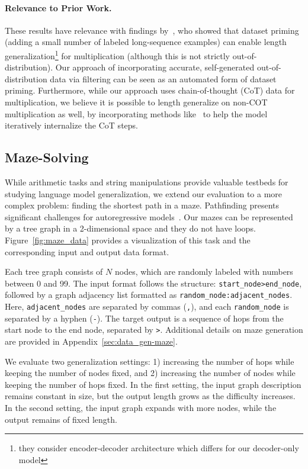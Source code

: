 \paragraph{Relevance to Prior Work. }
These results have relevance with findings by~\citet{jelassi2023length}, who showed that dataset priming (adding a small number of labeled long-sequence examples) can enable length generalization\footnote{they consider encoder-decoder architecture which differs for our decoder-only model} for multiplication (although this is not strictly out-of-distribution). Our approach of incorporating accurate, self-generated out-of-distribution data via filtering can be seen as an automated form of dataset priming.
Furthermore, while our approach uses chain-of-thought (CoT) data for multiplication, we believe it is possible to length generalize on non-COT multiplication as well, by incorporating methods like~\citet{deng2024explicit} to help the model iteratively internalize the CoT steps.



\subsection{Maze-Solving}\label{sec:maze}

While arithmetic tasks and string manipulations provide valuable testbeds for studying language model generalization, we extend our evaluation to a more complex problem: finding the shortest path in a maze. Pathfinding presents significant challenges for autoregressive models~\citep{bachmann2024pitfalls}. Our mazes can be represented by a tree graph in a 2-dimensional space and they do not have loops. Figure~\ref{fig:maze_data} provides a visualization of this task and the corresponding input and output data format. 

Each tree graph consists of \(N\) nodes, which are randomly labeled with numbers between 0 and 99. The input format follows the structure: 
\texttt{start\_node>end\_node}, followed by a graph adjacency list formatted as \texttt{random\_node:adjacent\_nodes}. Here, \texttt{adjacent\_nodes} are separated by commas (\texttt{,}), and each \texttt{random\_node} is separated by a hyphen (\texttt{-}). The target output is a sequence of hops from the start node to the end node, separated by \texttt{>}. Additional details on maze generation are provided in Appendix~\ref{sec:data_gen-maze}. 

We evaluate two generalization settings: 1) increasing the number of hops while keeping the number of nodes fixed, and 2) increasing the number of nodes while keeping the number of hops fixed. In the first setting, the input graph description remains constant in size, but the output length grows as the difficulty increases. In the second setting, the input graph expands with more nodes, while the output remains of fixed length. 





